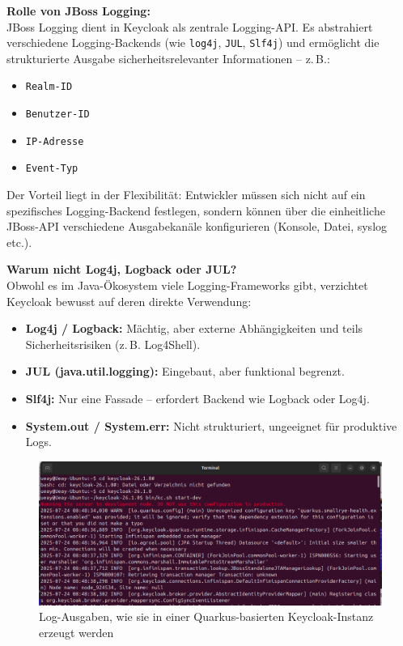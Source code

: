 \documentclass[a4paper,12pt]{article}
\begin{document}
	\vspace{0.5em}
	\textbf{Rolle von JBoss Logging:}\\
	JBoss Logging dient in Keycloak als zentrale Logging-API. Es abstrahiert verschiedene Logging-Backends (wie \texttt{log4j}, \texttt{JUL}, \texttt{Slf4j}) und ermöglicht die strukturierte Ausgabe sicherheitsrelevanter Informationen – z.\,B.:
	\begin{itemize}
		\item \texttt{Realm-ID}
		\item \texttt{Benutzer-ID}
		\item \texttt{IP-Adresse}
		\item \texttt{Event-Typ}
	\end{itemize}
	
	Der Vorteil liegt in der Flexibilität: Entwickler müssen sich nicht auf ein spezifisches Logging-Backend festlegen, sondern können über die einheitliche JBoss-API verschiedene Ausgabekanäle konfigurieren (Konsole, Datei, syslog etc.).
	
	\vspace{0.5em}
	\textbf{Warum nicht Log4j, Logback oder JUL?}\\
	Obwohl es im Java-Ökosystem viele Logging-Frameworks gibt, verzichtet Keycloak bewusst auf deren direkte Verwendung:
	\begin{itemize}
		\item \textbf{Log4j / Logback:} Mächtig, aber externe Abhängigkeiten und teils Sicherheitsrisiken (z.\,B. Log4Shell).
		\item \textbf{JUL (java.util.logging):} Eingebaut, aber funktional begrenzt.
		\item \textbf{Slf4j:} Nur eine Fassade – erfordert Backend wie Logback oder Log4j.
		\item \textbf{System.out / System.err:} Nicht strukturiert, ungeeignet für produktive Logs.
	\end{itemize}
	
	\begin{figure}[H]
		\centering
		\includegraphics[width=1.1\linewidth]{screenshot014}
		\caption{Log-Ausgaben, wie sie in einer Quarkus-basierten Keycloak-Instanz erzeugt werden}
		\label{fig:screenshot014}
	\end{figure}
	
\end{document}
